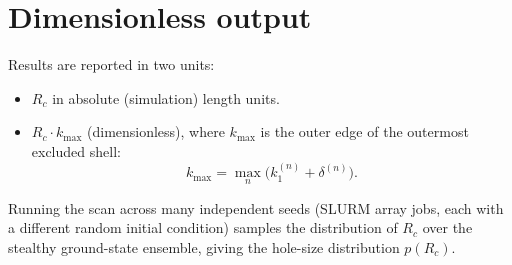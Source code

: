 \documentclass[11pt]{article}
\begin{document}
\section{Dimensionless output}

Results are reported in two units:
\begin{itemize}
    \item $R_c$ in absolute (simulation) length units.
    \item $R_c \cdot k_{\max}$ (dimensionless), where
          $k_{\max}$ is the outer edge of the outermost excluded shell:
          \begin{equation}
              k_{\max} = \max_{n}\bigl(k_1^{(n)} + \delta^{(n)}\bigr).
          \end{equation}
\end{itemize}
Running the scan across many independent seeds (SLURM array jobs, each
with a different random initial condition) samples the distribution of
$R_c$ over the stealthy ground-state ensemble, giving the hole-size
distribution $p(R_c)$.
\end{document}
